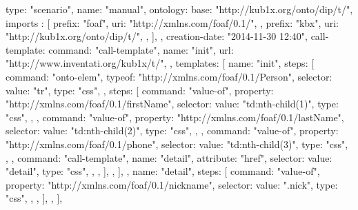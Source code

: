 \begtt
{
  type: "scenario", 
  name: "manual", 
  ontology: {
    base: "http://kub1x.org/onto/dip/t/", 
    imports : [
      {
        prefix: "foaf", 
        uri: "http://xmlns.com/foaf/0.1/", 
      }, 
      {
        prefix: "kbx", 
        uri: "http://kub1x.org/onto/dip/t/", 
      }, 
    ], 
  }, 
  creation-date: "2014-11-30 12:40", 
  call-template: {
    command: "call-template", 
    name: "init", 
    url: "http://www.inventati.org/kub1x/t/", 
  }, 
  templates: [
    {
      name: "init", 
      steps: [
        {
          command: "onto-elem", 
          typeof: "http://xmlns.com/foaf/0.1/Person", 
          selector: {
            value: "tr", 
            type: "css", 
          }, 
          steps: [
            {
              command: "value-of", 
              property: "http://xmlns.com/foaf/0.1/firstName", 
              selector: {
                value: "td:nth-child(1)", 
                type: "css", 
              }, 
            }, 
            {
              command: "value-of", 
              property: "http://xmlns.com/foaf/0.1/lastName", 
              selector: {
                value: "td:nth-child(2)", 
                type:  "css", 
              }, 
            }, 
            {
              command: "value-of", 
              property: "http://xmlns.com/foaf/0.1/phone", 
              selector: {
                value: "td:nth-child(3)", 
                type:  "css", 
              }, 
            },
            {
              command: "call-template", 
              name: "detail", 
              attribute: "href", 
              selector: {
                value: "detail", 
                type:  "css", 
              }, 
            }, 
          ], 
        }, 
      ], 
    }, 
    {
      name: "detail", 
      steps: [
        {
          command: "value-of", 
          property: "http://xmlns.com/foaf/0.1/nickname", 
          selector: {
            value: ".nick", 
            type:  "css", 
          }, 
        },
      ], 
    }, 
  ], 
}
\endtt






